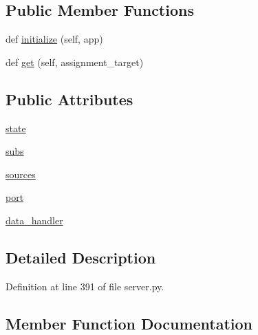 \subsection*{Public Member Functions}
\begin{DoxyCompactItemize}
\item 
def \hyperlink{classparlai_1_1mturk_1_1webapp_1_1server_1_1AssignmentHandler_a4d6fc0f6605557f5ede04d06db680640}{initialize} (self, app)
\item 
def \hyperlink{classparlai_1_1mturk_1_1webapp_1_1server_1_1AssignmentHandler_aefae6e70faeaf069860b5d63079b68a1}{get} (self, assignment\+\_\+target)
\end{DoxyCompactItemize}
\subsection*{Public Attributes}
\begin{DoxyCompactItemize}
\item 
\hyperlink{classparlai_1_1mturk_1_1webapp_1_1server_1_1AssignmentHandler_a91eb25d50a115871504574869c53ee15}{state}
\item 
\hyperlink{classparlai_1_1mturk_1_1webapp_1_1server_1_1AssignmentHandler_a1c7b99d261745891f7f408a8ee575384}{subs}
\item 
\hyperlink{classparlai_1_1mturk_1_1webapp_1_1server_1_1AssignmentHandler_a2a9d201d89e660f9337dce5b79f7969c}{sources}
\item 
\hyperlink{classparlai_1_1mturk_1_1webapp_1_1server_1_1AssignmentHandler_adfbd99a455bf117e46d06af4b54f4995}{port}
\item 
\hyperlink{classparlai_1_1mturk_1_1webapp_1_1server_1_1AssignmentHandler_a4c052c9d3481b6c237b86cc00238b46e}{data\+\_\+handler}
\end{DoxyCompactItemize}


\subsection{Detailed Description}


Definition at line 391 of file server.\+py.



\subsection{Member Function Documentation}
\mbox{\label{classparlai_1_1mturk_1_1webapp_1_1server_1_1AssignmentHandler_aefae6e70faeaf069860b5d63079b68a1}} 
